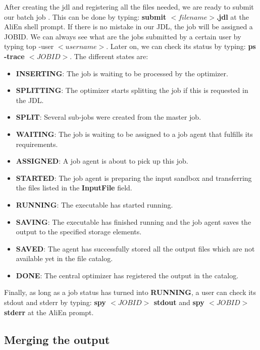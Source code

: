 After creating the jdl and registering all the files needed, we are ready to submit our batch job \cite{Note:RefGSHELL}. This can be done by typing: {\ttfamily \textbf{submit $<filename>$.jdl}} at the AliEn shell prompt. If there is no mistake in our JDL, the job will be assigned a JOBID. We can always see what are the jobs submitted by a certain user by typing {\ttfamily top -user $<username>$}. Later on, we can check its status by typing: {\ttfamily \textbf{ps -trace $<JOBID>$}}. The different states are:

\begin{itemize}

\item \textbf{INSERTING}: The job is waiting to be processed by the optimizer.
\item \textbf{SPLITTING}: The optimizer starts splitting the job if this is requested in the JDL.
\item \textbf{SPLIT}: Several sub-jobs were created from the master job.
\item \textbf{WAITING}: The job is waiting to be assigned to a job agent that fulfills its requirements.
\item \textbf{ASSIGNED}: A job agent is about to pick up this job.
\item \textbf{STARTED}: The job agent is preparing the input sandbox and transferring the files listed in the {\ttfamily \textbf{InputFile}} field.
\item \textbf{RUNNING}: The executable has started running.
\item \textbf{SAVING}: The executable has finished running and the job agent saves the output to the specified storage elements.
\item \textbf{SAVED}: The agent has successfully stored all the output files which are not available yet in the file catalog.
\item \textbf{DONE}: The central optimizer has registered the output in the catalog.

\end{itemize}

Finally, as long as a job status has turned into \textbf{RUNNING}, a user can check its stdout and stderr by typing: {\ttfamily \textbf{spy $<JOBID>$ stdout}} and {\ttfamily \textbf{spy $<JOBID>$ stderr}} at the AliEn prompt.


\subsection{Merging the output}

